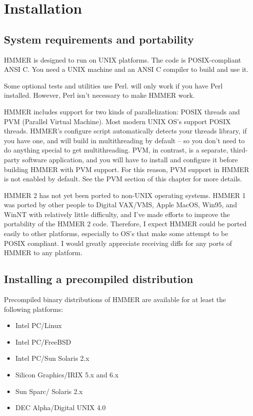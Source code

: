 \chapter{Installation}

\section{System requirements and portability}

HMMER is designed to run on UNIX platforms. The code is
POSIX-compliant ANSI C.  You need a UNIX machine and an ANSI C
compiler to build and use it.

Some optional tests and utilities use Perl.  will only
work if you have Perl installed. However, Perl isn't necessary to make
HMMER work.

HMMER includes support for two kinds of parallelization: POSIX threads
and PVM (Parallel Virtual Machine). Most modern UNIX OS's support
POSIX threads. HMMER's configure script automatically detects your
threads library, if you have one, and will build in multithreading by
default -- so you don't need to do anything special to get
multithreading. PVM, in contrast, is a separate, third-party software
application, and you will have to install and configure it before
building HMMER with PVM support. For this reason, PVM support in HMMER
is not enabled by default. See the PVM section of this chapter for
more details.

HMMER 2 has not yet been ported to non-UNIX operating systems.  HMMER
1 was ported by other people to Digital VAX/VMS, Apple MacOS, Win95,
and WinNT with relatively little difficulty, and I've made efforts to
improve the portability of the HMMER 2 code. Therefore, I expect HMMER
could be ported easily to other platforms, especially to OS's that
make some attempt to be POSIX compliant. I would greatly appreciate
receiving diffs for any ports of HMMER to any platform.

\section{Installing a precompiled distribution}

Precompiled binary distributions of HMMER are available for at least
the following platforms:
\begin{itemize}
\item Intel PC/Linux
\item Intel PC/FreeBSD
\item Intel PC/Sun Solaris 2.x
\item Silicon Graphics/IRIX 5.x and 6.x
\item Sun Sparc/ Solaris 2.x
\item DEC Alpha/Digital UNIX 4.0
\end{itemize}


